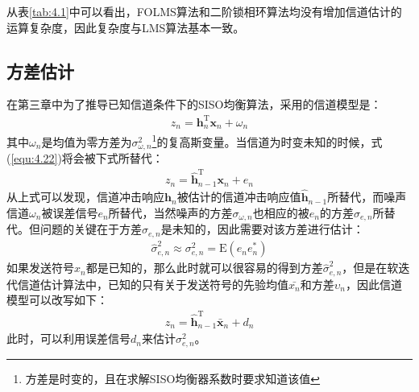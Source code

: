 从表\ref{tab:4.1}中可以看出，FOLMS算法和二阶锁相环算法均没有增加信道估计的运算复杂度，因此复杂度与LMS算法基本一致。
\subsection{方差估计}
在第三章中为了推导已知信道条件下的SISO均衡算法，采用的信道模型是：
\begin{eqnarray}
    z_n=\mathbf{h}_n^{\mathrm{T}}\mathbf{x}_n+\omega_n
    \label{equ:4.22}
\end{eqnarray}
其中$\omega_n$是均值为零方差为$\sigma_{\omega,n}^2$\footnote{方差是时变的，且在求解SISO均衡器系数时要求知道该值}的复高斯变量。当信道为时变未知的时候，式(\ref{equ:4.22})将会被下式所替代：
\begin{eqnarray}
    z_n=\hat{\mathbf{h}}_{n-1}^{\mathrm{T}}\mathbf{x}_n+e_n
    \label{equ:4.23}
\end{eqnarray}
从上式可以发现，信道冲击响应$\mathbf{h}_n$被估计的信道冲击响应值$\hat{\mathbf{h}}_{n-1}$所替代，而噪声信道$\omega_n$被误差信号$e_n$所替代，当然噪声的方差$\sigma_{\omega,n}$也相应的被$e_n$的方差$\sigma_{e,n}$所替代。但问题的关键在于方差$\sigma_{e,n}$是未知的，因此需要对该方差进行估计：
\begin{eqnarray}
    \hat{\sigma}_{e,n}^2\approx\sigma_{e,n}^2=\mathrm{E}(e_ne_n^*)
    \label{equ:4.24}
\end{eqnarray}
如果发送符号$x_n$都是已知的，那么此时就可以很容易的得到方差$\hat{\sigma}_{e,n}^2$，但是在软迭代信道估计算法中，已知的只有关于发送符号的先验均值$\bar{x_n}$和方差$\upsilon_n$，因此信道模型可以改写如下：
\begin{eqnarray}
    z_n=\hat{\mathbf{h}}_{n-1}^{\mathrm{T}}\bar{\mathbf{x}}_n+d_n
    \label{equ:4.25}
\end{eqnarray}
此时，可以利用误差信号$d_n$来估计$\sigma_{e,n}^2$。

